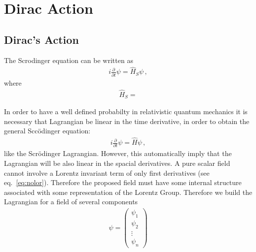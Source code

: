 
\chapter{Dirac Action}
\label{cha:dirac-action}


\section{Dirac's Action}
\label{sec:dirac-equation}
The Scrodinger equation can be written as
\begin{align}
    i\frac{\partial}{\partial t}\psi=\hat{H}_{S} \psi\,,  
\end{align}
where
\begin{align}
  \hat{H}_{S}=
\end{align}


In order to have a well defined probabilty in relativistic quantum mechanics it is necessary that Lagrangian be linear in the time derivative, in order to obtain the general Sccödinger equation:
\begin{align}
  i\frac{\partial}{\partial t}\psi=\hat{H} \psi\,,  
\end{align}
like the Scrödinger Lagrangian. However, this automatically imply that the Lagrangian will be also linear in the spacial derivatives. A pure scalar field cannot involve a Lorentz invariant term of only first derivatives (see eq.~\eqref{eq:nolor}). Therefore the proposed field must have some internal structure associated with some representation of the Lorentz Group. Therefore we build the Lagrangian for a field of several components
\begin{align}
  \psi=  \begin{pmatrix}
\psi_1\\
\psi_2\\
\vdots\\
\psi_n    
  \end{pmatrix}
\end{align}

